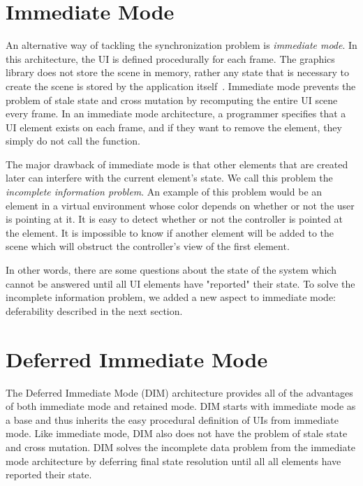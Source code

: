 \documentclass[conference,12pt]{IEEEtran}
\begin{document}
\section{Immediate Mode}\label{sec:immediate-mode}

An alternative way of tackling the synchronization problem is \textit{immediate
mode}.  In this architecture, the UI is defined procedurally for each frame. The
graphics library does not store the scene in memory, rather any state that is
necessary to create the scene is stored by the application
itself~\cite{Microsoft:Retained-vs-Immediate}. Immediate mode prevents the
problem of stale state and cross mutation by recomputing the entire UI scene
every frame. In an immediate mode architecture, a programmer specifies that a UI
element exists on each frame, and if they want to remove the element, they
simply do not call the function.

The major drawback of immediate mode is that other elements that are created
later can interfere with the current element's state. We call this problem the
\textit{incomplete information problem}. An example of this problem would be an
element in a virtual environment whose color depends on whether or not the user
is pointing at it. It is easy to detect whether or not the controller is pointed
at the element. It is impossible to know if another element will be added to the
scene which will obstruct the controller's view of the first element.

In other words, there are some questions about the state of the system which
cannot be answered until all UI elements have "reported" their state.  To solve
the incomplete information problem, we added a new aspect to immediate mode:
deferability described in the next section.

\section{Deferred Immediate Mode}\label{sec:dim}

The Deferred Immediate Mode (DIM) architecture provides all of the advantages of
both immediate mode and retained mode. DIM starts with immediate mode as a base
and thus inherits the easy procedural definition of UIs from immediate mode.
Like immediate mode, DIM also does not have the problem of stale state and cross
mutation.  DIM solves the incomplete data problem from the immediate mode
architecture by deferring final state resolution until all all elements have
reported their state.
\end{document}
